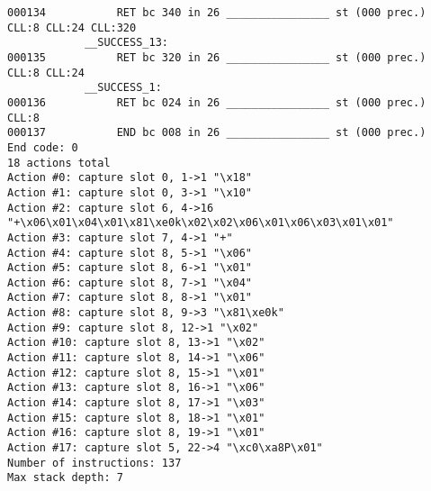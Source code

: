 \begin{changemargin}{-60mm}{0mm}
\begin{myquote}
\begin{Verbatim}[fontsize=\scriptsize]
000134           RET bc 340 in 26 ________________ st (000 prec.) CLL:8 CLL:24 CLL:320 
            __SUCCESS_13:
000135           RET bc 320 in 26 ________________ st (000 prec.) CLL:8 CLL:24 
            __SUCCESS_1:
000136           RET bc 024 in 26 ________________ st (000 prec.) CLL:8 
000137           END bc 008 in 26 ________________ st (000 prec.) 
End code: 0
18 actions total
Action #0: capture slot 0, 1->1 "\x18"
Action #1: capture slot 0, 3->1 "\x10"
Action #2: capture slot 6, 4->16 "+\x06\x01\x04\x01\x81\xe0k\x02\x02\x06\x01\x06\x03\x01\x01"
Action #3: capture slot 7, 4->1 "+"
Action #4: capture slot 8, 5->1 "\x06"
Action #5: capture slot 8, 6->1 "\x01"
Action #6: capture slot 8, 7->1 "\x04"
Action #7: capture slot 8, 8->1 "\x01"
Action #8: capture slot 8, 9->3 "\x81\xe0k"
Action #9: capture slot 8, 12->1 "\x02"
Action #10: capture slot 8, 13->1 "\x02"
Action #11: capture slot 8, 14->1 "\x06"
Action #12: capture slot 8, 15->1 "\x01"
Action #13: capture slot 8, 16->1 "\x06"
Action #14: capture slot 8, 17->1 "\x03"
Action #15: capture slot 8, 18->1 "\x01"
Action #16: capture slot 8, 19->1 "\x01"
Action #17: capture slot 5, 22->4 "\xc0\xa8P\x01"
Number of instructions: 137
Max stack depth: 7
\end{Verbatim}
\end{myquote}
\end{changemargin}

